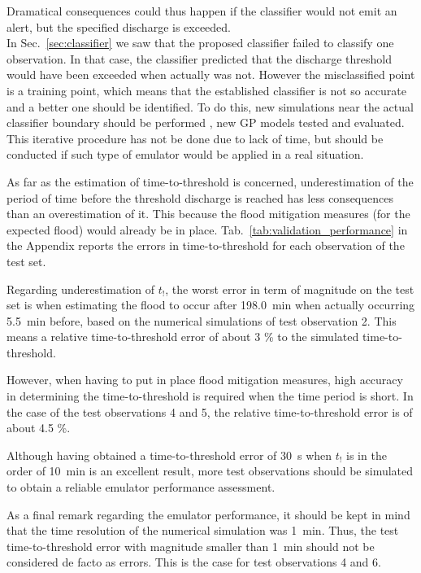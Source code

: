 Dramatical consequences could thus happen if the classifier would not emit an alert, but the specified discharge is exceeded.\\

In Sec.~\ref{sec:classifier} we saw that the proposed classifier failed to classify one observation.
In that case, the classifier predicted that the discharge threshold would have been exceeded when actually was not. However the misclassified point is a training point, which means that the established classifier is not so accurate and a better one should be identified. 
To do this, new simulations near the actual classifier boundary should be performed , new GP models tested and evaluated. This iterative procedure has not be done due to lack of time, but should be conducted if such type of emulator would be applied in a real situation.  

As far as the estimation of time-to-threshold is concerned, underestimation of the period of time before the threshold discharge is reached has less consequences than an overestimation of it. This because the flood mitigation measures (for the expected flood) would already be in place. 
Tab.~\ref{tab:validation_performance} in the Appendix reports the errors in time-to-threshold for each observation of the test set.

Regarding underestimation of $t_!$, the worst error in term of magnitude on the test set is when estimating the flood to occur after \SI{198.0}{\minute} when actually occurring \SI{5.5}{\minute} before, based on the numerical simulations of test observation 2.
This means a relative time-to-threshold error of about 3 \% to the simulated time-to-threshold. 

However, when having to put in place flood mitigation measures, high accuracy in determining the time-to-threshold is required when the time period is short. In the case of the test observations 4 and 5, the relative time-to-threshold error is of about 4.5 \%. 

Although having obtained a time-to-threshold error of \SI{30}{\s}  when $t_!$ is in the order of \SI{10}{\minute} is an excellent result, more test observations should be simulated to obtain a reliable emulator performance assessment.
 
As a final remark regarding the emulator performance, it should be kept in mind that the time resolution of the numerical simulation was \SI{1}{\minute}. Thus, the test time-to-threshold error with magnitude smaller than \SI{1}{min} should not be considered de facto as errors. This is the case for test observations 4 and 6. 

